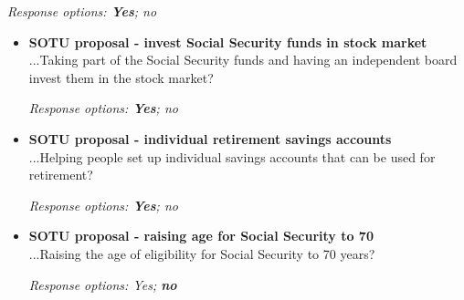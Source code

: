 \documentclass[12pt, letterpaper]{article}
\begin{document}
\begin{itemize}
{\begin{itemize}
\textit{Response options: \textbf{Yes}; no}
\end{itemize}

   \begin{itemize}
\item \textbf{SOTU proposal - invest Social Security funds in stock market} \\
...Taking part of the Social Security funds and having an independent board invest them in the stock market?

\textit{Response options: \textbf{Yes}; no}
\end{itemize}

   \begin{itemize}
\item \textbf{SOTU proposal - individual retirement savings accounts} \\
...Helping people set up individual savings accounts that can be used for retirement?

\textit{Response options: \textbf{Yes}; no}
\end{itemize}

   \begin{itemize}
\item \textbf{SOTU proposal - raising age for Social Security to 70} \\
...Raising the age of eligibility for Social Security to 70 years?

\textit{Response options: Yes; \textbf{no}}
\end{itemize}}
\end{itemize}
\end{document}

